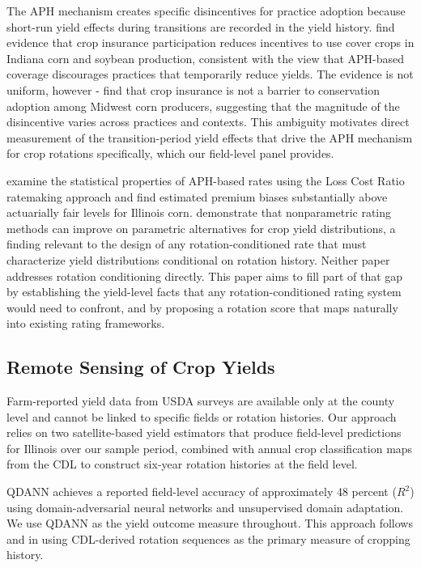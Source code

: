 \documentclass[12pt,letterpaper]{article}
\theoremstyle{remark}
\theoremstyle{remark}
\theoremstyle{plain}
\theoremstyle{definition}
\begin{document}
The APH mechanism creates specific disincentives for practice adoption because short-run yield effects during transitions are recorded in the yield history. \cite{Connor2022} find evidence that crop insurance participation reduces incentives to use cover crops in Indiana corn and soybean production, consistent with the view that APH-based coverage discourages practices that temporarily reduce yields. The evidence is not uniform, however - \cite{Fleckenstein2020} find that crop insurance is not a barrier to conservation adoption among Midwest corn producers, suggesting that the magnitude of the disincentive varies across practices and contexts. This ambiguity motivates direct measurement of the transition-period yield effects that drive the APH mechanism for crop rotations specifically, which our field-level panel provides.

\cite{Woodard2011} examine the statistical properties of APH-based rates using the Loss Cost Ratio ratemaking approach and find estimated premium biases substantially above actuarially fair levels for Illinois corn. \cite{Ker2000} demonstrate that nonparametric rating methods can improve on parametric alternatives for crop yield distributions, a finding relevant to the design of any rotation-conditioned rate that must characterize yield distributions conditional on rotation history. Neither paper addresses rotation conditioning directly. This paper aims to fill part of that gap by establishing the yield-level facts that any rotation-conditioned rating system would need to confront, and by proposing a rotation score that maps naturally into existing rating frameworks.

\subsection{\label{subsec:remote_sensing}Remote Sensing of Crop Yields}

Farm-reported yield data from USDA surveys are available only at the county level and cannot be linked to specific fields or rotation histories. Our approach relies on two satellite-based yield estimators that produce field-level predictions for Illinois over our sample period, combined with annual crop classification maps from the CDL to construct six-year rotation histories at the field level.

QDANN \citep{Ma2024} achieves a reported field-level accuracy of approximately 48 percent ($R^2$) using domain-adversarial neural networks and unsupervised domain adaptation. We use QDANN as the yield outcome measure throughout. This approach follows \citet{Pates2025} and \citet{socolar2021} in using CDL-derived rotation sequences as the primary measure of cropping history.
\end{document}
